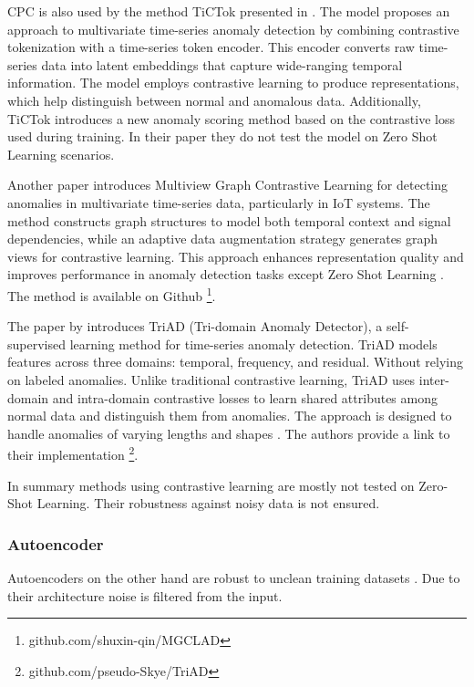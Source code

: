 CPC is also used by the method TiCTok presented in \cite{kang_tictok_2023}. The model proposes an approach to multivariate time-series anomaly detection by combining contrastive tokenization with a time-series token encoder. This encoder converts raw time-series data into latent embeddings that capture wide-ranging temporal information. The model employs contrastive learning to produce representations, which help distinguish between normal and anomalous data. Additionally, TiCTok introduces a new anomaly scoring method based on the contrastive loss used during training. In their paper they do not test the model on Zero Shot Learning scenarios.

Another paper introduces Multiview Graph Contrastive Learning for detecting anomalies in multivariate time-series data, particularly in IoT systems. The method constructs graph structures to model both temporal context and signal dependencies, while an adaptive data augmentation strategy generates graph views for contrastive learning. This approach enhances representation quality and improves performance in anomaly detection tasks except Zero Shot Learning \cite{qin_multiview_2023}. The method is available on Github \footnote{\fussy\tiny github.com/shuxin-qin/MGCLAD}.

The paper by \cite{sun_unraveling_2023} introduces TriAD (Tri-domain Anomaly Detector), a self-supervised learning method for time-series anomaly detection. TriAD models features across three domains: temporal, frequency, and residual. Without relying on labeled anomalies. Unlike traditional contrastive learning, TriAD uses inter-domain and intra-domain contrastive losses to learn shared attributes among normal data and distinguish them from anomalies. The approach is designed to handle anomalies of varying lengths and shapes \cite{sun_unraveling_2023}. The authors provide a link to their implementation \footnote{\fussy\tiny github.com/pseudo-Skye/TriAD}.

In summary methods using contrastive learning are mostly not tested on Zero-Shot Learning. Their robustness against noisy data is not ensured.

\subsubsection{Autoencoder}
Autoencoders on the other hand are robust to unclean training datasets \cite[p. 2487]{abdulaal_practical_2021}. Due to their architecture noise is filtered from the input.

